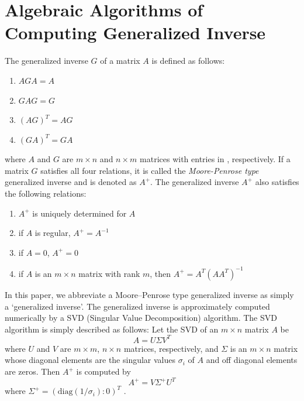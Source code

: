 \section{Algebraic Algorithms of Computing Generalized 
Inverse}
The generalized inverse $G$ of a matrix $A$ is defined 
as follows:
\begin{enumerate}
\item $ AGA = A $
\item $ GAG = G $
\item $ (AG)^T = AG $
\item $ (GA)^T = GA $
\end{enumerate}
where $A$ and $G$ are $m \times n$ and $n \times m$ matrices 
with entries in {\R}, respectively.  If a matrix $G$ satisfies 
all four relations, 
it is called the {\it Moore-Penrose type} generalized 
inverse and is denoted as $A^+$.  The generalized inverse 
$A^+$ also satisfies the following relations: 
\begin{enumerate}
\item $A^+$ is uniquely determined for $A$ 
\item if $A$ is regular, $A^+ = A^{-1}$ 
\item if $A=0 $, $A^+ = 0$ 
\item if $A$ is an $m \times n$ matrix with rank $m$, 
then $A^+ = A^T(AA^T)^{-1}$
\end{enumerate}
In this paper, we abbreviate a Moore--Penrose type generalized 
inverse as simply a `generalized inverse'.  The generalized 
inverse is approximately computed numerically by a SVD (Singular 
Value Decomposition) algorithm.  
The SVD algorithm is simply described as follows:
Let the SVD of an $m \times n$ matrix $A$ be 
$$ A = U \Sigma V^T $$
where $U$ and $V$ are $m \times m$, $n \times n$ matrices, respectively,
and $\Sigma $ is an $m \times n $ matrix whose diagonal elements are 
the singular values $\sigma_i $ of $A$ and off diagonal elements 
are zeros. Then $A^+$ is computed by
$$ A^+ = V \Sigma^+ U^T $$
where $\Sigma^+ = (\mbox{diag}(1/\sigma_i) : 0)^T$ . 

